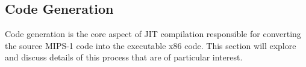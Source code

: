 \subsection{Code Generation}

Code generation is the core aspect of JIT compilation responsible for converting the source MIPS-1 code into the executable x86 code. This section will explore and discuss details of this process that are of particular interest.




